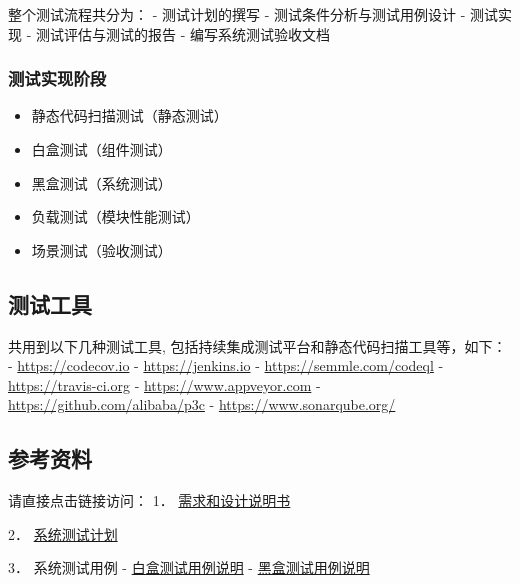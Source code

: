 \documentclass[hyperref, a4paper]{ctexart}
\providecommand{\tightlist}{%
  \setlength{\itemsep}{0pt}\setlength{\parskip}{0pt}}
\begin{document}
整个测试流程共分为： - 测试计划的撰写 - 测试条件分析与测试用例设计 -
测试实现 - 测试评估与测试的报告 - 编写系统测试验收文档

\hypertarget{ux6d4bux8bd5ux5b9eux73b0ux9636ux6bb5}{%
\subsubsection{测试实现阶段}\label{ux6d4bux8bd5ux5b9eux73b0ux9636ux6bb5}}

\begin{itemize}
\tightlist
\item
  静态代码扫描测试（静态测试）
\item
  白盒测试（组件测试）
\item
  黑盒测试（系统测试）
\item
  负载测试（模块性能测试）
\item
  场景测试（验收测试）
\end{itemize}

\hypertarget{ux6d4bux8bd5ux5de5ux5177}{%
\subsection{测试工具}\label{ux6d4bux8bd5ux5de5ux5177}}

共用到以下几种测试工具, 包括持续集成测试平台和静态代码扫描工具等，如下：
- \url{https://codecov.io} - \url{https://jenkins.io} -
\url{https://semmle.com/codeql} - \url{https://travis-ci.org} -
\url{https://www.appveyor.com} - \url{https://github.com/alibaba/p3c} -
\url{https://www.sonarqube.org/}

\hypertarget{ux53c2ux8003ux8d44ux6599}{%
\subsection{参考资料}\label{ux53c2ux8003ux8d44ux6599}}

请直接点击链接访问： 1．
\href{https://github.com/StrayBird-ATSH/SoftwareQA-Testing/blob/master/requirements/\%E5\%87\%BA\%E9\%A2\%98\%E7\%B3\%BB\%E7\%BB\%9F\%E9\%9C\%80\%E6\%B1\%82\%E6\%96\%87\%E6\%A1\%A3-to\%E5\%AD\%A6\%E7\%94\%9F.pdf}{需求和设计说明书}

2．
\href{https://github.com/StrayBird-ATSH/SoftwareQA-Testing/blob/master/lab3/lab3.pdf}{系统测试计划}

3． 系统测试用例 -
\href{https://github.com/StrayBird-ATSH/SoftwareQA-Testing/blob/master/lab4/lab4\%E5\%87\%BA\%E9\%A2\%98\%E8\%80\%83\%E8\%AF\%95\%E7\%B3\%BB\%E7\%BB\%9F\%E7\%99\%BD\%E7\%9B\%92\%E6\%B5\%8B\%E8\%AF\%95\%E6\%8A\%A5\%E5\%91\%8A.pdf}{白盒测试用例说明}
-
\href{https://github.com/StrayBird-ATSH/SoftwareQA-Testing/blob/master/lab5/lab5.pdf}{黑盒测试用例说明}
\end{document}

